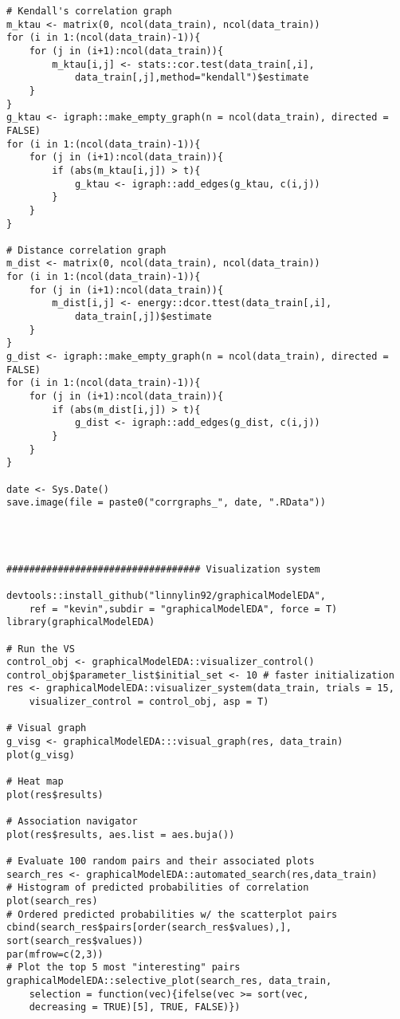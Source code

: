 {\begin{lstlisting}
# Kendall's correlation graph
m_ktau <- matrix(0, ncol(data_train), ncol(data_train))
for (i in 1:(ncol(data_train)-1)){
	for (j in (i+1):ncol(data_train)){
		m_ktau[i,j] <- stats::cor.test(data_train[,i],
			data_train[,j],method="kendall")$estimate
	}
}
g_ktau <- igraph::make_empty_graph(n = ncol(data_train), directed = FALSE)
for (i in 1:(ncol(data_train)-1)){
	for (j in (i+1):ncol(data_train)){
		if (abs(m_ktau[i,j]) > t){
			g_ktau <- igraph::add_edges(g_ktau, c(i,j))
		}
	}
}

# Distance correlation graph
m_dist <- matrix(0, ncol(data_train), ncol(data_train))
for (i in 1:(ncol(data_train)-1)){
	for (j in (i+1):ncol(data_train)){
		m_dist[i,j] <- energy::dcor.ttest(data_train[,i],
			data_train[,j])$estimate
	}
}
g_dist <- igraph::make_empty_graph(n = ncol(data_train), directed = FALSE)
for (i in 1:(ncol(data_train)-1)){
	for (j in (i+1):ncol(data_train)){
		if (abs(m_dist[i,j]) > t){
			g_dist <- igraph::add_edges(g_dist, c(i,j))
		}
	}
}

date <- Sys.Date()
save.image(file = paste0("corrgraphs_", date, ".RData"))




################################## Visualization system

devtools::install_github("linnylin92/graphicalModelEDA", 
	ref = "kevin",subdir = "graphicalModelEDA", force = T)
library(graphicalModelEDA)

# Run the VS
control_obj <- graphicalModelEDA::visualizer_control()
control_obj$parameter_list$initial_set <- 10 # faster initialization
res <- graphicalModelEDA::visualizer_system(data_train, trials = 15, 
	visualizer_control = control_obj, asp = T)

# Visual graph
g_visg <- graphicalModelEDA:::visual_graph(res, data_train)
plot(g_visg)

# Heat map
plot(res$results)

# Association navigator
plot(res$results, aes.list = aes.buja())

# Evaluate 100 random pairs and their associated plots
search_res <- graphicalModelEDA::automated_search(res,data_train)
# Histogram of predicted probabilities of correlation
plot(search_res) 
# Ordered predicted probabilities w/ the scatterplot pairs
cbind(search_res$pairs[order(search_res$values),], sort(search_res$values)) 
par(mfrow=c(2,3))
# Plot the top 5 most "interesting" pairs
graphicalModelEDA::selective_plot(search_res, data_train, 
	selection = function(vec){ifelse(vec >= sort(vec, 
	decreasing = TRUE)[5], TRUE, FALSE)})


\end{lstlisting}}
